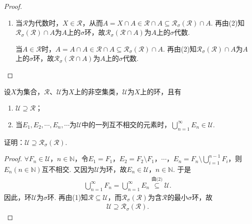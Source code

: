 \documentclass[../../main.tex]{subfiles}%
\begin{document}
\begin{proof}
\begin{enumerate}[(1)]
{\color{blue}证法二:}
\begin{align*}
\mathscr{R}_\sigma(\mathscr{R})\cap A&=\{\mathscr{R}\text{中至多可数个元素}E_1,E_2,\cdots,E_n,\cdots\text{的至多可数次“$\cup$”、“$\setminus$”运算后所得集与}A\text{的交}\} \\
&=\{\mathscr{R}\cap A\text{中至多可数个元素}E_1\cap A,E_2\cap A,\cdots,E_n\cap A,\cdots\text{的至多可数次“$\cup$”、“$\setminus$”运算后所得的集}\} \\
&=\mathscr{R}_\sigma(\mathscr{R}\cap A).
\end{align*}

\item 当$\mathscr{R}$为代数时，$X\in\mathscr{R}$，从而$A=X\cap A\in\mathscr{R}\cap A\subseteq\mathscr{R}_\sigma(\mathscr{R})\cap A$. 再由(2)知$\mathscr{R}_\sigma(\mathscr{R})\cap A$为$A$上的$\sigma$环，故$\mathscr{R}_\sigma(\mathscr{R}\cap A)$为$A$上的$\sigma$代数.

当$A\in\mathscr{R}$时，$A=A\cap A\in\mathscr{R}\cap A\subseteq\mathscr{R}_\sigma(\mathscr{R})\cap A$. 再由(2)知$\mathscr{R}_\sigma(\mathscr{R})\cap A$为$A$上的$\sigma$环，故$\mathscr{R}_\sigma(\mathscr{R}\cap A)$为$A$上的$\sigma$代数.
\end{enumerate}
\end{proof}

\begin{example}
设$X$为集合，$\mathscr{R}$、$\mathscr{U}$为$X$上的非空集类，$\mathscr{U}$为$X$上的环，且有
\begin{enumerate}[(1)]
\item $\mathscr{U}\supseteq\mathscr{R}$；
\item 当$E_1,E_2,\cdots,E_n,\cdots$为$\mathscr{U}$中的一列互不相交的元素时，$\bigcup_{n=1}^{\infty}E_n\in\mathscr{U}$.
\end{enumerate}
证明：$\mathscr{U}\supseteq\mathscr{R}_\sigma(\mathscr{R})$.
\end{example}
\begin{proof}
$\forall F_n\in\mathscr{U}$，$n\in\mathbb{N}$，令$E_1=F_1$，$E_2=F_2\setminus F_1$，$\cdots$，$E_n=F_n\setminus\bigcup_{i=1}^{n-1}F_i$，则$E_n(n\in\mathbb{N})$互不相交. 又因为$\mathscr{U}$为环，故$E_n\in\mathscr{U}$，$n\in\mathbb{N}$. 于是
\begin{align*}
\bigcup_{n=1}^{\infty}F_n=\bigcup_{n=1}^{\infty}E_n\stackrel{\text{由(2)}}{\subseteq}\mathscr{U}.
\end{align*}
因此，环$\mathscr{U}$为$\sigma$环. 再由(1)知$\mathscr{R}\subseteq\mathscr{U}$，而$\mathscr{R}_\sigma(\mathscr{R})$为含$\mathscr{R}$的最小$\sigma$环，故
\begin{align*}
\mathscr{U}\supseteq\mathscr{R}_\sigma(\mathscr{R}).
\end{align*}
\end{proof}
\end{document}
